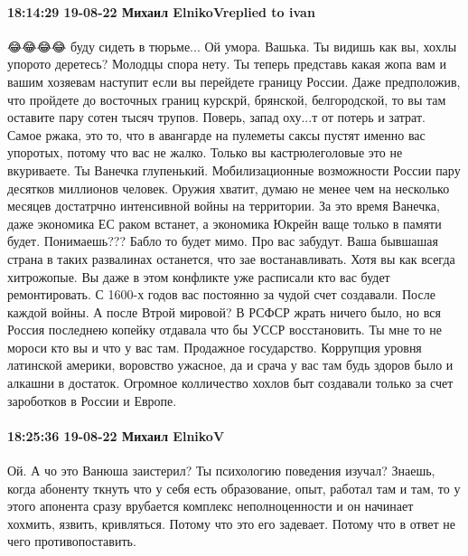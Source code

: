  
 
 
 
 

\paragraph{18:14:29 19-08-22 Михаил ElnikoVreplied to ivan}

😂😂😂😂 буду сидеть в тюрьме... Ой умора.
Вашька. Ты видишь как вы, хохлы упорото деретесь? Молодцы спора нету.
Ты теперь представь какая жопа вам и вашим хозяевам наступит если вы перейдете границу России. Даже предположив, что пройдете до восточных границ курскрй, брянской, белгородской, то вы там оставите пару сотен тысяч трупов. Поверь, запад оху...т от потерь и затрат. Самое ржака, это то, что в авангарде на пулеметы саксы пустят именно вас упоротых, потому что вас не жалко.
Только вы кастрюлеголовые это не вкуриваете.
Ты Ванечка глупенький. Мобилизационные возможности России пару десятков миллионов человек. Оружия хватит, думаю не менее чем на несколько месяцев достатрчно интенсивной войны на территории. За это время Ванечка, даже экономика ЕС раком встанет, а экономика Юкрейн ваще только в памяти будет. Понимаешь??? Бабло то будет мимо. Про вас забудут. Ваша бывшашая страна в таких развалинах останется, что зае востанавливать. Хотя вы как всегда хитрожопые. Вы даже в этом конфликте уже расписали кто вас будет ремонтировать. С 1600-х годов вас постоянно за чудой счет создавали. После каждой войны. А после Втрой мировой? В РСФСР жрать ничего было, но вся Россия последнею копейку отдавала что бы УССР восстановить.
Ты мне то не мороси кто вы и что у вас там. Продажное государство. Коррупция уровня латинской америки, воровство ужасное, да и срача у вас там будь здоров было и алкашни в достаток. Огромное колличество хохлов быт создавали только за счет зароботков в России и Европе.


\paragraph{18:25:36 19-08-22 Михаил ElnikoV}

Ой. А чо это Ванюша заистерил?
Ты психологию поведения изучал?
Знаешь, когда абоненту ткнуть что у себя есть образование, опыт, работал там и там, то у этого апонента сразу врубается комплекс неполноценности и он начинает хохмить, язвить, кривляться. Потому что это его задевает. Потому что в ответ не чего противопоставить.
